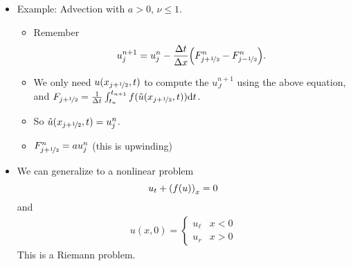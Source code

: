 \documentclass{article}
\newcommand{\half}{\nicefrac{1}{2}}
\newcommand{\Dx}{\Delta x}
\newcommand{\Dt}{\Delta t}
\begin{document}
\begin{itemize}
\begin{enumerate}
\begin{itemize}
                \end{itemize}
            \end{enumerate}
            \item Example: Advection with $a > 0$, $\nu \leq 1$.
            \begin{itemize}
                \item Remember $$u_j^{n+1} = u_j^n - \frac{\Dt}{\Dx}\qty(F_{j+\half}^{n} - F_{j-\half}^n).$$
                \item We only need $u(x_{j+\half},t)$ to compute the $u_J^{n+1}$ using the above equation, and $F_{j+\half} = \frac{1}{\Dt}\int_{t_n}^{t_{n+1}}f(\tilde{u}(x_{j+\half},t))\dd t$.
                \item So $\tilde{u}(x_{j+\half},t) = u_j^n$.
                \item $F_{j+\half}^n = au_j^n$ (this is upwinding)
            \end{itemize}
            \item We can generalize to a nonlinear problem $$u_t + \qty(f(u))_x = 0$$ and
            \begin{align*}
                u(x,0) = \begin{cases}
                    u_\ell & x < 0 \\
                    u_r & x > 0
                \end{cases}
            \end{align*}
            This is a Riemann problem.
        \end{itemize}
\end{document}
